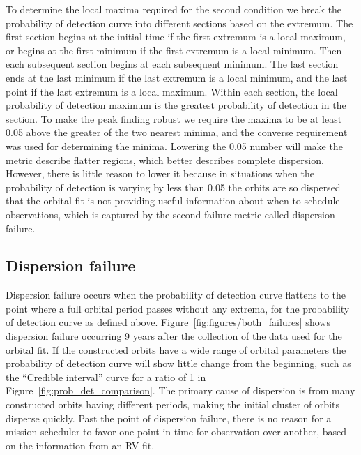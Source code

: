 To determine the local maxima required for the second condition we break the probability of
detection curve into different sections based on the extremum. The
first section begins at the initial time if the first extremum is a local maximum, or begins at the
first minimum if the first extremum is a local minimum. Then each subsequent section begins at each
subsequent minimum. The last section ends at the last minimum if the last extremum is a local
minimum, and the last point if the last extremum is a local maximum. Within each section, the local
probability of detection maximum is the greatest probability of detection in the section. To make
the peak finding robust we require the maxima to be at least 0.05 above the greater of the two
nearest minima, and the converse requirement was used for determining the minima. Lowering the 0.05
number will make the metric describe flatter regions, which better describes complete dispersion.
However, there is little reason to lower it because in situations when the probability of detection
is varying by less than 0.05 the orbits are so dispersed that the orbital fit is not providing
useful information about when to schedule observations, which is captured by the second failure
metric called dispersion failure.

\subsection{Dispersion failure}%
\label{sub:dispersion_failure} 

Dispersion failure occurs when the probability of detection curve flattens to the point where a full
orbital period passes without any extrema, for the probability of detection curve as defined above.
Figure~\ref{fig:figures/both_failures} shows dispersion failure occurring 9 years after the
collection of the data used for the orbital fit.  If the constructed orbits have a wide range of
orbital parameters the probability of detection curve will show little change from the beginning,
such as the ``Credible interval'' curve for a ratio of 1 in Figure~\ref{fig:prob_det_comparison}.
The primary cause of dispersion is from many constructed orbits having different periods, making the
initial cluster of orbits disperse quickly.  Past the point of dispersion failure, there is no reason
for a mission scheduler to favor one point in time for observation over another, based on the
information from an RV fit.

